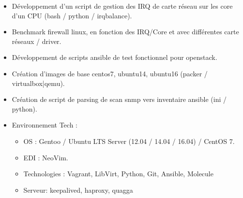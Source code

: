 \documentclass[10pt,a4paper,sans]{moderncv}
\begin{document}
{\begin{itemize}
    \item Développement d'un script de gestion des IRQ de carte réseau sur les core d'un CPU (bash / python / irqbalance).
    \item Benchmark firewall linux, en fonction des IRQ/Core et avec différentes carte réseaux / driver.
    \item Développement de scripts ansible de test fonctionnel pour openstack.
    \item Création d'images de base centos7, ubuntu14, ubuntu16 (packer / virtualbox|qemu).
    \item Création de script de parsing de scan snmp vers inventaire ansible (ini / python).
    \item Environnement Tech :
      \begin{itemize}%
        \item OS : Gentoo / Ubuntu LTS Server (12.04 / 14.04 / 16.04) / CentOS 7.
        \item EDI : NeoVim.
        \item Technologies : Vagrant, LibVirt, Python, Git, Ansible, Molecule
        \item Serveur: keepalived, haproxy, quagga
      \end{itemize}
  \end{itemize}}
\end{document}
